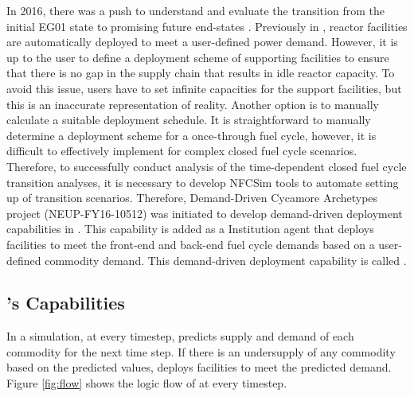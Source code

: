 In 2016, there was a push to understand and evaluate the 
transition from the initial EG01 state to promising future 
end-states \cite{feng_standardized_2016}.
Previously in \Cyclus, reactor facilities are automatically 
deployed to meet a user-defined power demand. 
However, it is up to the user to define a deployment scheme of 
supporting facilities to ensure that there is no gap in the supply 
chain that results in idle reactor capacity. 
To avoid this issue, users 
have to set infinite capacities for the support facilities, 
but this is an inaccurate representation of reality. 
Another option is to manually calculate a suitable deployment 
schedule. 
It is straightforward to manually determine a deployment scheme 
for a once-through fuel cycle, however, it is difficult to effectively 
implement for complex closed fuel cycle scenarios.  
Therefore, to successfully conduct analysis of the time-dependent 
closed fuel cycle transition
analyses, it is necessary to develop \gls{NFCSim} tools to  
automate setting up of transition scenarios. 
Therefore, Demand-Driven Cycamore Archetypes project
(NEUP-FY16-10512) was initiated to develop demand-driven deployment 
capabilities in \Cyclus.
This capability is added as a \Cyclus Institution
agent that deploys facilities to meet the front-end and back-end 
fuel cycle demands based on a user-defined commodity demand. 
This demand-driven deployment capability is called 
\deploy. 

\subsection{\deploy's Capabilities}
\label{sec:d3ploy}
In a \Cyclus simulation, at every timestep, \deploy 
predicts supply and demand of each commodity for the next time 
step. 
If there is an undersupply of any commodity based 
on the predicted values, \deploy deploys facilities to meet 
the predicted demand.  
Figure \ref{fig:flow} shows the logic flow of \deploy 
at every timestep. 

